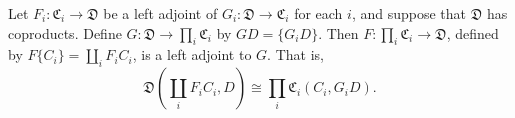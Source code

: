 Let $F_i: \mathfrak{C}_i \rightarrow \mathfrak{D}$ be a left adjoint of $G_i: \mathfrak{D} \rightarrow \mathfrak{C}_i$ for each $i$, and suppose that $\mathfrak{D}$ has coproducts. Define $G: \mathfrak{D} \rightarrow \prod_i \mathfrak{C}_i$ by $GD = \{G_i D\}$. Then $F: \prod_i \mathfrak{C}_i \rightarrow \mathfrak{D}$, defined by $F\{C_i\} = \coprod_i F_i C_i$, is a left adjoint to $G$. That is,
$$
\mathfrak{D}\left(\coprod_i F_i C_i, D\right) \cong \prod_i \mathfrak{C}_i(C_i, G_i D).
$$
